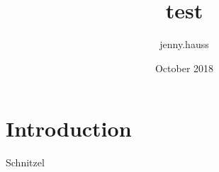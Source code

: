 \documentclass{article}
\title{test}
\author{jenny.hauss }
\date{October 2018}
\begin{document}
\maketitle

\section{Introduction}
Schnitzel
\end{document}

